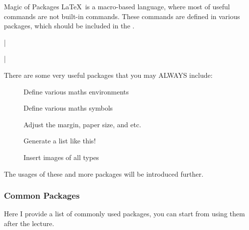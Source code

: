 \begin{frame}[fragile]{Magic of Packages}
	\LaTeX\ is a macro-based language, where most of useful commands are not built-in commands. These commands are defined in various packages, which should be included in the .
	\begin{command}
		\LC|\usepackage[options]{package}|
	\end{command}
	There are some very useful packages that you may \alert{ALWAYS} include:
	\begin{description}
		\item[] Define various maths environments
		\item[] Define various maths symbols
		\item[] Adjust the margin, paper size, and etc.
		\item[] Generate a list like this!
		\item[] Insert images of all types
	\end{description}
	The usages of these and more packages will be introduced further.
\end{frame}

\begin{frame}[fragile]
	\frametitle{Common Packages}
	Here I provide a list of commonly used packages, you can start from using them after the lecture. \medskip

	\inputminted{latex}{../examples/packages.tex}
\end{frame}




